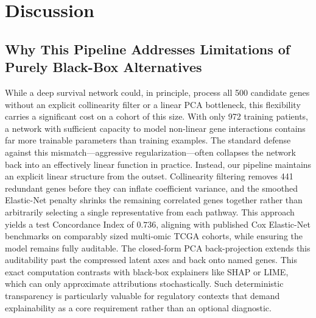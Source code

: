 \documentclass[10pt,a4paper]{article}
\begin{document}
\section{Discussion}

\subsection{Why This Pipeline Addresses Limitations of Purely Black-Box Alternatives}
While a deep survival network could, in principle, process all 500 candidate genes without an explicit collinearity filter or a linear PCA bottleneck, this flexibility carries a significant cost on a cohort of this size. With only 972 training patients, a network with sufficient capacity to model non-linear gene interactions contains far more trainable parameters than training examples. The standard defense against this mismatch---aggressive regularization---often collapses the network back into an effectively linear function in practice. Instead, our pipeline maintains an explicit linear structure from the outset. Collinearity filtering removes 441 redundant genes before they can inflate coefficient variance, and the smoothed Elastic-Net penalty shrinks the remaining correlated genes together rather than arbitrarily selecting a single representative from each pathway. This approach yields a test Concordance Index of $0.736$, aligning with published Cox Elastic-Net benchmarks on comparably sized multi-omic TCGA cohorts, while ensuring the model remains fully auditable. The closed-form PCA back-projection extends this auditability past the compressed latent axes and back onto named genes. This exact computation contrasts with black-box explainers like SHAP or LIME, which can only approximate attributions stochastically. Such deterministic transparency is particularly valuable for regulatory contexts that demand explainability as a core requirement rather than an optional diagnostic.
\end{document}
